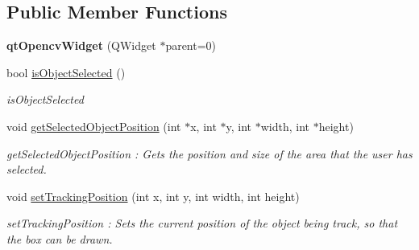 \subsection*{Public Member Functions}
\begin{DoxyCompactItemize}
\item 
\hypertarget{classqt_opencv_widget_ae80caf08be9bf57a0444b23cbd9ca422}{}{\bfseries qt\+Opencv\+Widget} (Q\+Widget $\ast$parent=0)\label{classqt_opencv_widget_ae80caf08be9bf57a0444b23cbd9ca422}

\item 
bool \hyperlink{classqt_opencv_widget_a822e7402c94a638efea5d862346c093a}{is\+Object\+Selected} ()
\begin{DoxyCompactList}\small\item\em is\+Object\+Selected \end{DoxyCompactList}\item 
void \hyperlink{classqt_opencv_widget_ab097719076101b6000b96503df2ef000}{get\+Selected\+Object\+Position} (int $\ast$x, int $\ast$y, int $\ast$width, int $\ast$height)
\begin{DoxyCompactList}\small\item\em get\+Selected\+Object\+Position \+: Gets the position and size of the area that the user has selected. \end{DoxyCompactList}\item 
void \hyperlink{classqt_opencv_widget_a87ef220f455b2e568c1e77d4cfc97271}{set\+Tracking\+Position} (int x, int y, int width, int height)
\begin{DoxyCompactList}\small\item\em set\+Tracking\+Position \+: Sets the current position of the object being track, so that the box can be drawn. \end{DoxyCompactList}\end{DoxyCompactItemize}
